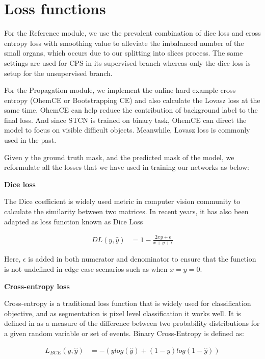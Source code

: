 \section{Loss functions}
\label{sec:loss}

For the Reference module, we use the prevalent combination of dice loss and cross entropy loss with smoothing value to alleviate the imbalanced number of the small organs, which occurs due to our splitting into slices process. The same settings are used for CPS in its supervised branch whereas only the dice loss is setup for the unsupervised branch. 

For the Propagation module, we implement the online hard example cross entropy (OhemCE or Bootstrapping CE) \cite{ohemce16wu} and also calculate the Lovasz loss \cite{lovasz18berman} at the same time. OhemCE can help reduce the contribution of background label to the final loss. And since STCN is trained on binary task, OhemCE can direct the model to focus on visible difficult objects. Meanwhile, Lovasz loss is commonly used in the past. 


Given y the ground truth mask, and  the predicted mask of the model, we reformulate all the losses that we have used in training our networks as below: 

\textbf{Dice loss}

The Dice coefficient is widely used metric in computer vision community to calculate the similarity between two matrices. In recent years, it has also been adapted as loss function known as Dice Loss \cite{sudre2017diceloss}

\begin{align}
        DL (y, \hat{y}) &= 1 - \frac{2xy+\epsilon}{x+y+\epsilon}
\end{align}

Here, $\epsilon$ is added in both numerator and denominator to ensure that the function is not undefined in edge case scenarios such as when $x = y = 0$.

\textbf{Cross-entropy loss}

Cross-entropy is a traditional loss function that is widely used for classification objective, and as segmentation is pixel level classification it works well. It is defined in \cite{yi2004ce} as a measure of the difference between two probability distributions for a given random variable or set of events.
Binary Cross-Entropy is defined as:

\begin{align}
        L_{BCE} (y, \hat{y}) &= -(y log (\hat{y}) + (1-y)log(1-\hat{y}))
\end{align}

